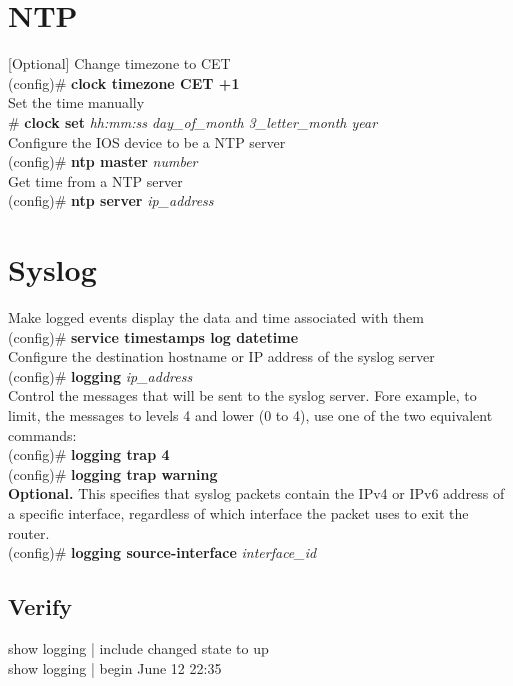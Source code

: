 \section{NTP}
\textrm{[Optional] Change timezone to CET}\\
(config)\# \textbf{clock timezone CET +1}\vspace{11pt}\\
\textrm{Set the time manually}\\
\# \textbf{clock set} \textit{hh:mm:ss day\_of\_month 3\_letter\_month year}\vspace{11pt}\\
\textrm{Configure the IOS device to be a NTP server}\\
(config)\# \textbf{ntp master} \textit{number}\vspace{11pt}\\
\textrm{Get time from a NTP server}\\
(config)\# \textbf{ntp server} \textit{ip\_address}
\section{Syslog}
\textrm{Make logged events display the data and time associated with them}\\
(config)\# \textbf{service timestamps log datetime}\vspace{11pt}\\
\textrm{Configure the destination hostname or IP address of the syslog server}\\
(config)\# \textbf{logging} \textit{ip\_address}\vspace{11pt}\\
\textrm{Control the messages that will be sent to the syslog server. Fore example, to limit, the messages to levels 4 and lower (0 to 4), use one of the two equivalent commands:}\\
(config)\# \textbf{logging trap 4}\\
(config)\# \textbf{logging trap warning}\vspace{11pt}\\
\textrm{\textbf{Optional.} This specifies that syslog packets contain the IPv4 or IPv6 address of a specific interface, regardless of which interface the packet uses to exit the router.}\\
(config)\# \textbf{logging source-interface} \textit{interface\_id}
\subsection{Verify}
show logging | include changed state to up\\
show logging | begin June 12 22:35
